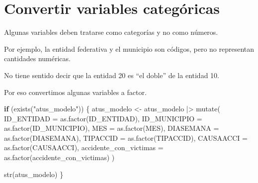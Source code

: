 \documentclass[
  11pt,
  letterpaper,
]{book}
\newenvironment{Shaded}{\begin{snugshade}}{\end{snugshade}}
\newcommand{\AttributeTok}[1]{\textcolor[rgb]{0.40,0.45,0.13}{#1}}
\newcommand{\ControlFlowTok}[1]{\textcolor[rgb]{0.00,0.23,0.31}{\textbf{#1}}}
\newcommand{\FunctionTok}[1]{\textcolor[rgb]{0.28,0.35,0.67}{#1}}
\newcommand{\NormalTok}[1]{\textcolor[rgb]{0.00,0.23,0.31}{#1}}
\newcommand{\OtherTok}[1]{\textcolor[rgb]{0.00,0.23,0.31}{#1}}
\newcommand{\SpecialCharTok}[1]{\textcolor[rgb]{0.37,0.37,0.37}{#1}}
\newcommand{\StringTok}[1]{\textcolor[rgb]{0.13,0.47,0.30}{#1}}
\begin{document}
\begin{Shaded}
\end{Shaded}

\section{Convertir variables
categóricas}\label{convertir-variables-categuxf3ricas}

Algunas variables deben tratarse como categorías y no como números.

Por ejemplo, la entidad federativa y el municipio son códigos, pero no
representan cantidades numéricas.

No tiene sentido decir que la entidad 20 es ``el doble'' de la entidad
10.

Por eso convertimos algunas variables a factor.

\begin{Shaded}
\begin{Highlighting}[]
\ControlFlowTok{if}\NormalTok{ (}\FunctionTok{exists}\NormalTok{(}\StringTok{"atus\_modelo"}\NormalTok{)) \{}
\NormalTok{  atus\_modelo }\OtherTok{\textless{}{-}}\NormalTok{ atus\_modelo }\SpecialCharTok{|\textgreater{}}
    \FunctionTok{mutate}\NormalTok{(}
      \AttributeTok{ID\_ENTIDAD =} \FunctionTok{as.factor}\NormalTok{(ID\_ENTIDAD),}
      \AttributeTok{ID\_MUNICIPIO =} \FunctionTok{as.factor}\NormalTok{(ID\_MUNICIPIO),}
      \AttributeTok{MES =} \FunctionTok{as.factor}\NormalTok{(MES),}
      \AttributeTok{DIASEMANA =} \FunctionTok{as.factor}\NormalTok{(DIASEMANA),}
      \AttributeTok{TIPACCID =} \FunctionTok{as.factor}\NormalTok{(TIPACCID),}
      \AttributeTok{CAUSAACCI =} \FunctionTok{as.factor}\NormalTok{(CAUSAACCI),}
      \AttributeTok{accidente\_con\_victimas =} \FunctionTok{as.factor}\NormalTok{(accidente\_con\_victimas)}
\NormalTok{    )}

  \FunctionTok{str}\NormalTok{(atus\_modelo)}
\NormalTok{\}}
\end{Highlighting}
\end{Shaded}
\end{document}
